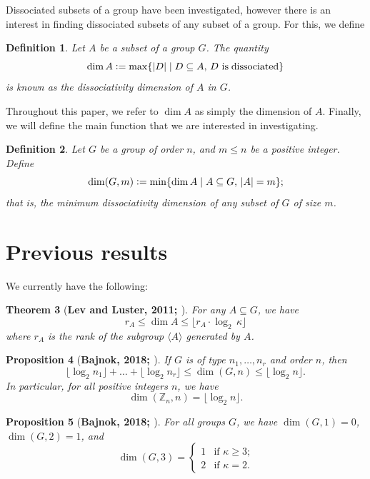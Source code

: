 \documentclass[11pt]{article}
\newcommand{\N}{\mathbb{N}}
\newcommand{\Z}{\mathbb{Z}}
\newcommand{\sfold}{\,_{\!\pm}\!\!\hat{}\,\,}
\newtheorem{thm}{Theorem}
\newtheorem{defin}[thm]{Definition}
\newtheorem{prop}[thm]{Proposition}
\begin{document}
Dissociated subsets of a group have been investigated, however there is an interest in finding dissociated subsets of any subset of a group. For this, we define
\begin{defin}
Let $A$ be a subset of a group $G$. The quantity
    \[\dim A \vcentcolon= \max\{|D|\mid D \subseteq A,\, D \operatorname{\,is\; dissociated}\}\]
    is known as the dissociativity dimension of $A$ in $G$.
\end{defin}

Throughout this paper, we refer to $\dim A$ as simply the dimension of $A$. Finally, we will define the main function that we are interested in investigating.
\begin{defin}
Let $G$ be a group of order $n$, and $m\leq n$ be a positive integer. Define
    \[\dim(G,m)\vcentcolon=\min \{\dim A\mid A \subseteq G,\, |A|=m\};\]
    that is, the minimum dissociativity dimension of any subset of $G$ of size $m$.
\end{defin}


\section{Previous results}
We currently have the following:
\begin{thm}[\bf Lev and Luster, 2011; \cite{lev}]\label{F.188}
For any $A\subseteq G$, we have
    \[r_A\leq \dim A\leq \lfloor r_A\cdot\log_2\,\kappa\rfloor\]
    where $r_A$ is the rank of the subgroup $\langle A\rangle$ generated by $A$.
\end{thm}
\begin{prop}[\bf Bajnok, 2018; \cite{bb}]\label{nr}
If $G$ is of type $n_1,\ldots,n_r$ and order $n$, then
\[\lfloor\log_2 n_1\rfloor+\ldots+\lfloor\log_2 n_r\rfloor\leq\dim(G,n)\leq\lfloor\log_2 n\rfloor.\]
In particular, for all positive integers $n$, we have
\[\dim(\Z_n,n)=\lfloor\log_2 n\rfloor.\]
\end{prop}

\begin{prop}[\bf Bajnok, 2018; \cite{bb}]\label{123}
For all groups $G$, we have $\dim(G, 1)=0$, $\dim(G, 2)=1$, and
\[\dim(G, 3) = \begin{cases}1 & \text{if $\kappa\geq3$;} \\ 2 & \text{if $\kappa=2$.}\end{cases}\]
\end{prop}
\end{document}
